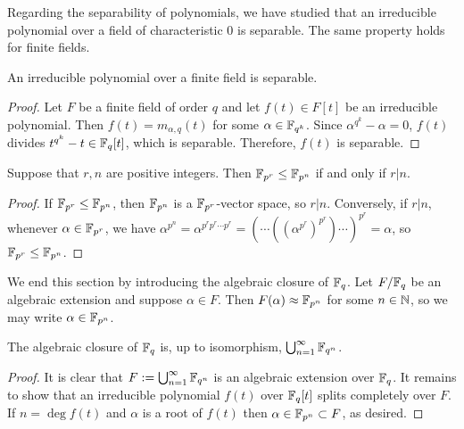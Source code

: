Regarding the separability of polynomials, we have studied that an irreducible polynomial over a field of characteristic 0 is separable.
The same property holds for finite fields.
\begin{prop}
    An irreducible polynomial over a finite field is separable.
\end{prop}
\begin{proof}
    Let $F$ be a finite field of order $q$ and let $f(t)\in F[t]$ be an irreducible polynomial.
    Then $f(t)=m_{\alpha, q}(t)$ for some $\alpha\in{\mathbb{F}}_{q^k}$.
    Since $\alpha^{q^k}-\alpha=0$, $f(t)$ divides $t^{q^k}-t\in{\mathbb{F}}_q[t]$, which is separable.
    Therefore, $f(t)$ is separable.
\end{proof}

\begin{prop}
    Suppose that $r, n$ are positive integers.
    Then ${\mathbb{F}}_{p^r}\leq{\mathbb{F}}_{p^n}$ if and only if $r|n$.
\end{prop}
\begin{proof}
    If ${\mathbb{F}}_{p^r}\leq{\mathbb{F}}_{p^n}$, then ${\mathbb{F}}_{p^n}$ is a ${\mathbb{F}}_{p^r}$-vector space, so $r|n$.
    Conversely, if $r|n$, whenever $\alpha\in{\mathbb{F}}_{p^r}$, we have $\alpha^{p^n}=\alpha^{p^r p^r \cdots p^r}=(\cdots((\alpha^{p^r})^{p^r})\cdots)^{p^r}=\alpha$, so ${\mathbb{F}}_{p^r}\leq{\mathbb{F}}_{p^n}$.
\end{proof}

We end this section by introducing the algebraic closure of ${\mathbb{F}}_q$.
Let $F/{\mathbb{F}}_q$ be an algebraic extension and suppose $\alpha\in F$.
Then $F(\alpha)\approx{\mathbb{F}}_{p^n}$ for some $n\in{\mathbb{N}}$, so we may write $\alpha\in{\mathbb{F}}_{p^n}$.
\begin{thm}
    The algebraic closure of ${\mathbb{F}}_q$ is, up to isomorphism, $\bigcup_{n=1}^\infty {\mathbb{F}}_{q^n}$.
\end{thm}
\begin{proof}
    It is clear that $F:=\bigcup_{n=1}^\infty {\mathbb{F}}_{q^n}$ is an algebraic extension over ${\mathbb{F}}_q$.
    It remains to show that an irreducible polynomial $f(t)$ over ${\mathbb{F}}_q[t]$ splits completely over $F$.
    If $n=\deg f(t)$ and $\alpha$ is a root of $f(t)$ then $\alpha\in{\mathbb{F}}_{p^n}\subset F$, as desired.
\end{proof}